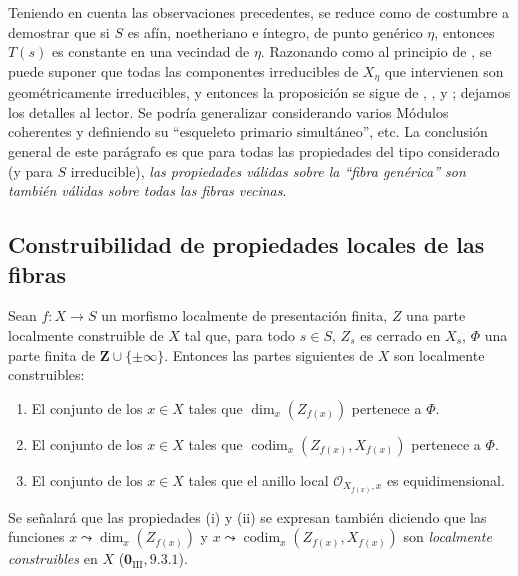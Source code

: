 \begin{remark}[9.8.9]
\medskip
Teniendo en cuenta las observaciones precedentes, se reduce como de costumbre a demostrar que si $S$ es afín, noetheriano e íntegro, de punto genérico $\eta$, entonces $T(s)$ es constante en una vecindad de $\eta$.
Razonando como al principio de , se puede suponer que todas las componentes irreducibles de $X_\eta$ que intervienen son geométricamente irreducibles, y entonces la proposición se sigue de , ,  y ; dejamos los detalles al lector.
Se podría generalizar considerando varios Módulos coherentes y definiendo su ``esqueleto primario simultáneo'', etc.
La conclusión general de este parágrafo es que para todas las propiedades del tipo considerado (y para $S$ irreducible), \emph{las propiedades válidas sobre la ``fibra genérica'' son también válidas sobre todas las fibras vecinas}.
\end{remark}

\subsection{Construibilidad de propiedades locales de las fibras}
\label{subsection:IV.9.9}
\label{IV.9.9}

\begin{proposition}[9.9.1]
\label{IV.9.9.1}
Sean $f:X\to S$ un morfismo localmente de presentación finita, $Z$ una
parte localmente construible de $X$ tal que, para todo $s\in S$, $Z_s$ es
cerrado en $X_s$, $\Phi$ una parte finita de $\mathbf Z\cup\{\pm\infty\}$.
Entonces las partes siguientes de $X$ son localmente construibles:
\begin{enumerate}
\item[\textup{(i)}] El conjunto de los $x\in X$ tales que
$\dim_x(Z_{f(x)})$ pertenece a $\Phi$.
\item[\textup{(ii)}] El conjunto de los $x\in X$ tales que
$\operatorname{codim}_x(Z_{f(x)},X_{f(x)})$ pertenece a $\Phi$.
\item[\textup{(iii)}] El conjunto de los $x\in X$ tales que el anillo local
$\mathcal O_{X_{f(x)},x}$ es equidimensional.
\end{enumerate}
\end{proposition}

Se señalará que las propiedades (i) y (ii) se expresan también diciendo que las
funciones $x\leadsto\dim_x(Z_{f(x)})$ y
$x\leadsto\operatorname{codim}_x(Z_{f(x)},X_{f(x)})$ son
\emph{localmente construibles} en $X$ ($\mathbf 0_{\mathrm{III}},9.3.1$).


